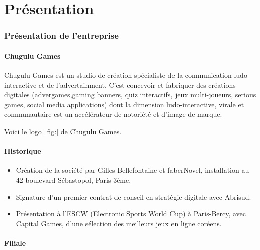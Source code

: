 \chapter{Présentation} %

\subsection{Présentation de l'entreprise} %

\subsubsection{Chugulu Games} %

Chugulu Games est un studio de création spécialiste de la communication ludo-interactive et de l'advertainment. C'est concevoir et fabriquer des créations digitales (advergames,gaming banners, quiz interactifs, jeux multi-joueurs, serious games, social media applications) dont la dimension ludo-interactive, virale et communautaire est un accélérateur de notoriété et d'image de marque.

Voici le logo~\ref{fig:} de Chugulu Games.



\subsubsection{Historique} %

\begin{itemize}
	\item Création de la société par Gilles Bellefontaine et faberNovel, installation au 42 boulevard Sébastopol, Paris 3ème.
	\item Signature d’un premier contrat de conseil en stratégie digitale avec Abrisud.
	\item Présentation à l’ESCW (Electronic Sports World Cup) à Paris-Bercy, avec Capital Games, d’une sélection des meilleurs jeux en ligne coréens.
\end{itemize}



\subsubsection{Filiale} %


